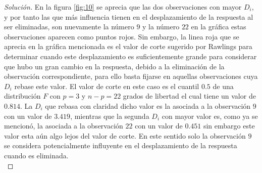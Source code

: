 \documentclass[10.5pt,notitlepage]{article}
\newenvironment{solucion}
  {\begin{proof}[Solución]}
  {\end{proof}}
\theoremstyle{plain}
\begin{document}
\begin{solucion}
En la figura \ref{fig:10} se aprecia que las dos observaciones con mayor \(D_i\), y por tanto las que más influencia tienen en el desplazamiento de la respuesta al ser eliminadas, son nuevamente la número \(9\) y la número \(22\) en la gráfica estas observaciones aparecen como puntos rojos. Sin embargo, la linea roja que se aprecia en la gráfica mencionada es el valor de corte sugerido por Rawlings para determinar cuando este desplazamiento es suficientemente grande para considerar que hubo un gran cambio en la respuesta, debido a la eliminación de la observación correspondiente, para ello basta fijarse en aquellas observaciones cuya \(D_i\) rebase este valor. El valor de corte en este caso es el cuantil \(0.5\) de una distribución \(F\) con \(p = 3\) y \(n - p = 22\) grados de libertad el cual tiene un valor de \(0.814\). La \(D_i\) que rebasa con claridad dicho valor es la asociada a la observación \(9\) con un valor de \(3.419\), mientras que la segunda \(D_i\) con mayor valor es, como ya se mencionó, la asociada a la observación \(22\) con un valor de \(0.451\) sin embargo este valor esta aún algo lejos del valor de corte. En este sentido solo la observación \(9\) se considera potencialmente influyente en el desplazamiento de la respuesta cuando es eliminada.\\ 


\end{solucion}
\end{document}
